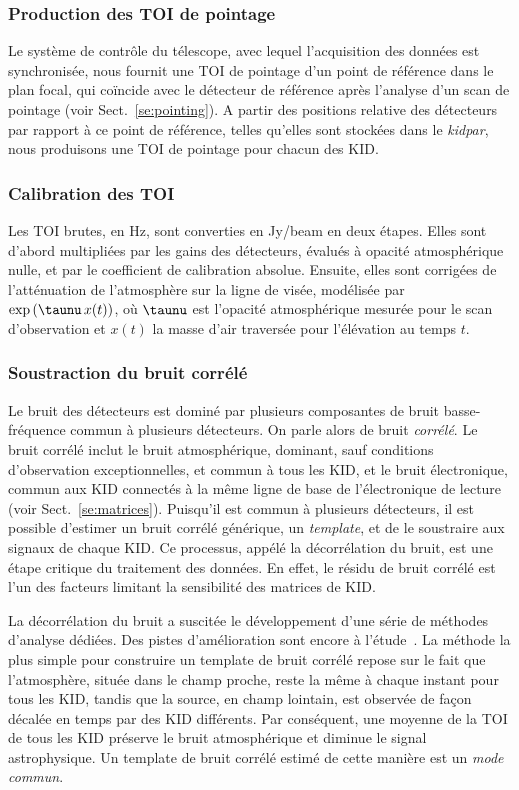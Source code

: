 \subsubsection{Production des TOI de pointage} Le système de contrôle du
télescope, avec lequel l'acquisition des données est synchronisée,
nous fournit une TOI de pointage d'un point de référence dans le
plan focal, qui coïncide avec le détecteur de référence après
l'analyse d'un scan de pointage (voir Sect.~\ref{se:pointing}). A
partir des positions relative des détecteurs par rapport à ce point
de référence, telles qu'elles sont stockées dans le \emph{kidpar},
nous produisons une TOI de pointage pour chacun des KID.

\subsubsection{Calibration des TOI} Les TOI brutes, en Hz, sont converties en
Jy/beam en deux étapes. Elles sont d'abord multipliées par les gains
des détecteurs, évalués à opacité atmosphérique nulle, et par le
coefficient de calibration absolue. Ensuite, elles sont corrigées de
l'atténuation de l'atmosphère sur la ligne de visée, modélisée par
$\exp{\left( \taunu \, x(t)\right)}$, où $\taunu$ est l'opacité atmosphérique
mesurée pour le scan d'observation et $x(t)$ la masse d'air
traversée pour l'élévation au temps $t$.

\subsubsection{Soustraction du bruit corrélé}
Le bruit des détecteurs est dominé par plusieurs composantes de bruit
basse-fréquence commun à plusieurs détecteurs. On parle alors de bruit
\emph{corrélé}. Le bruit corrélé inclut le bruit atmosphérique,
dominant, sauf conditions d'observation exceptionnelles, et commun à
tous les KID, et le bruit électronique, commun aux KID connectés à la
même ligne de base de l'électronique de lecture (voir
Sect.~\ref{se:matrices}). Puisqu'il est commun à plusieurs détecteurs,
il est possible d'estimer un bruit corrélé générique, un
\emph{template}, et de le soustraire aux signaux de chaque KID. Ce
processus, appélé la décorrélation du bruit, est une étape critique du
traitement des données. En effet, le résidu de bruit corrélé est l'un
des facteurs limitant la sensibilité des matrices de KID.

La décorrélation du bruit a suscitée le développement d'une série de
méthodes d'analyse dédiées. Des pistes d'amélioration sont encore à
l'étude~\citep{Ponthieu2020}. La méthode la plus simple pour construire
un template de bruit corrélé repose sur le fait que l'atmosphère,
située dans le champ proche, reste la même à chaque instant pour tous
les KID, tandis que la source, en champ lointain, est observée de
façon décalée en temps par des KID différents. Par conséquent, une
moyenne de la TOI de tous les KID préserve le bruit atmosphérique et
diminue le signal astrophysique. Un template de bruit corrélé estimé
de cette manière est un \emph{mode commun}.

